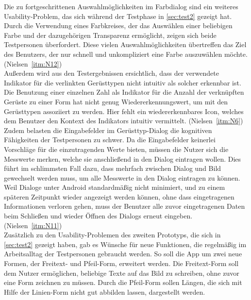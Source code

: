 Die zu fortgeschrittenen Auswahlmöglichkeiten im Farbdialog sind ein weiteres Usability-Problem, das sich während der Testphase in \autoref{sec:test2} gezeigt hat.
Durch die Verwendung eines Farbkreises, der das Auswählen einer beliebigen Farbe und der dazugehörigen Transparenz ermöglicht, zeigen sich beide Testpersonen überfordert.
Diese vielen Auswahlmöglichkeiten übertreffen das Ziel des Benutzers, der nur schnell und unkompliziert eine Farbe auszuwählen möchte.
(Nielsen~\autoref{itm:N12}) \\

Außerdem wird aus den Testergebnissen ersichtlich, dass der verwendete Indikator für die verlinkten Gerüsttypen nicht intuitiv als solcher erkennbar ist.
Die Benutzung einer einzelnen Zahl als Indikator für die Anzahl der verknüpften Gerüste zu einer Form hat nicht genug Wiedererkennungswert, um mit den Gerüsttypen assoziiert zu werden.
Hier fehlt ein wiedererkennbares Icon, welches dem Benutzer den Kontext des Indikators intuitiv vermittelt.
(Nielsen~\autoref{itm:N6}) \\

Zudem belasten die Eingabefelder im Gerüsttyp-Dialog die kognitiven Fähigkeiten der Testpersonen zu schwer.
Da die Eingabefelder keinerlei Vorschläge für die einzutragenden Werte bieten, müssen die Nutzer sich die Messwerte merken, welche sie anschließend in den Dialog eintragen wollen.
Dies führt im schlimmsten Fall dazu, dass mehrfach zwischen Dialog und Bild gewechselt werden muss, um alle Messwerte in den Dialog eintragen zu können.
Weil Dialoge unter Android standardmäßig nicht minimiert, und zu einem späteren Zeitpunkt wieder angezeigt werden können, ohne dass eingetragenen Informationen verloren gehen, muss der Benutzer alle zuvor eingetragenen Daten beim Schließen und wieder Öffnen des Dialogs erneut eingeben.
(Nielsen~\autoref{itm:N11}) \\

Zusätzlich zu den Usability-Problemen des zweiten Prototyps, die sich in \autoref{sec:test2} gezeigt haben, gab es Wünsche für neue Funktionen, die regelmäßig im Arbeitsalltag der Testpersonen gebraucht werden.
So soll die App um zwei neue Formen, der Freitext- und Pfeil-Form, erweitert werden.
Die Freitext-Form soll dem Nutzer ermöglichen, beliebige Texte auf das Bild zu schreiben, ohne zuvor eine Form zeichnen zu müssen. 
Durch die Pfeil-Form sollen Längen, die sich mit Hilfe der Linien-Form nicht gut abbilden lassen, dargestellt werden. \\


